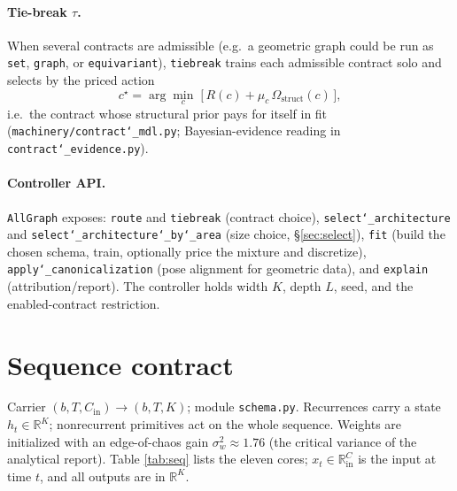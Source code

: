 \documentclass[11pt]{article}
\newcommand{\allowbreakhere}{\discretionary{}{}{}}
\newcommand{\code}[1]{\texttt{\def\_{\char`_\allowbreakhere}#1}}
\newcommand{\R}{\mathbb{R}}
\newcommand{\Cin}{C_{\mathrm{in}}}
\begin{document}
\paragraph{Tie-break $\tau$.} When several contracts are admissible (e.g.\ a geometric graph could be run as
\code{set}, \code{graph}, or \code{equivariant}), \code{tiebreak} trains each admissible contract solo and
selects by the priced action
\begin{equation}
\label{eq:tiebreak}
c^\star=\arg\min_{c}\;\Big[\,R(c)+\mu_c\,\Omega_{\mathrm{struct}}(c)\,\Big],
\end{equation}
i.e.\ the contract whose structural prior pays for itself in fit (\code{machinery/contract\_mdl.py};
Bayesian-evidence reading in \code{contract\_evidence.py}).

\paragraph{Controller API.} \code{AllGraph} exposes: \code{route} and \code{tiebreak} (contract choice),
\code{select\_architecture} and \code{select\_architecture\_by\_area} (size choice, \S\ref{sec:select}),
\code{fit} (build the chosen schema, train, optionally price the mixture and discretize),
\code{apply\_canonicalization} (pose alignment for geometric data), and \code{explain} (attribution/report).
The controller holds width $K$, depth $L$, seed, and the enabled-contract restriction.

\section{Sequence contract}
\label{sec:seq}

Carrier $(b,T,\Cin)\!\to\!(b,T,K)$; module \code{schema.py}. Recurrences carry a state
$h_t\in\R^K$; nonrecurrent primitives act on the whole sequence. Weights are initialized with an
edge-of-chaos gain $\sigma_w^2\!\approx\!1.76$ (the critical variance of the analytical report). Table
\ref{tab:seq} lists the eleven cores; $x_t\in\R^\Cin$ is the input at time $t$, and all outputs are in $\R^K$.
\end{document}
